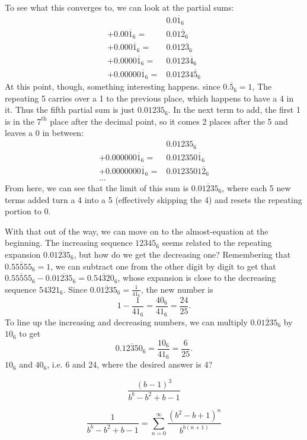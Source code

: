\documentclass{article}
\begin{document}
To see what this converges to, we can look at the partial sums:
\begin{align*}
  & 0.0\overline{1}_6 \\
  + 0.00\overline{1}_6 =& 0.01\overline{2}_6 \\
  + 0.000\overline{1}_6 =& 0.012\overline{3}_6 \\
  + 0.0000\overline{1}_6 =& 0.0123\overline{4}_6 \\
  + 0.00000\overline{1}_6 =& 0.01234\overline{5}_6
\end{align*}
At this point, though, something interesting happens.
since $0.\overline{5}_6=1$,
The repeating 5 carries over a 1 to the previous place,
which happens to have a 4 in it.
Thus the fifth partial sum is just $0.01235_6$.
In the next term to add,
the first 1 is in the $7^\text{th}$ place after the decimal point,
so it comes 2 places after the 5 and leaves a 0 in between:
\begin{align*}
  & 0.01235_6 \\
  + 0.000000\overline{1}_6 =& 0.012350\overline{1}_6 \\
  + 0.0000000\overline{1}_6 =& 0.0123501\overline{2}_6 \\
  \ldots &
\end{align*}
From here, we can see that the limit of this sum is
$0.\overline{01235}_6$,
where each 5 new terms added turn a 4 into a 5
(effectively skipping the 4)
and resets the repeating portion to 0.

With that out of the way, we can move on to the almost-equation at the beginning.
The increasing sequence $12345_6$ seems related to the repeating expansion $0.\overline{01235_6}$,
but how do we get the decreasing one?
Remembering that $0.\overline{55555}_6=1$,
we can subtract one from the other digit by digit
to get that $0.\overline{55555}_6-0.\overline{01235_6}=0.\overline{54320}_6$,
whose expansion is close to the decreasing sequence $54321_6$.
Since $0.\overline{01235}_6=\frac{1}{41_6}$,
the new number is
\[1-\frac{1}{41_6}=\frac{40_6}{41_6}=\frac{24}{25}.\]
To line up the increasing and decreasing numbers,
we can multiply $0.\overline{01235}_6$ by $10_6$
to get
\[0.\overline{12350}_6 = \frac{10_6}{41_6} = \frac{6}{25}.\]
$10_6$ and $40_6$, i.e. 6 and 24, where the desired answer is 4?

\[\frac{(b-1)^3}{b^b-b^2+b-1}\]

\[\frac{1}{b^b-b^2+b-1} = \sum_{n=0}^\infty \frac{(b^2-b+1)^n}{b^{b(n+1)}} \]
\end{document}
